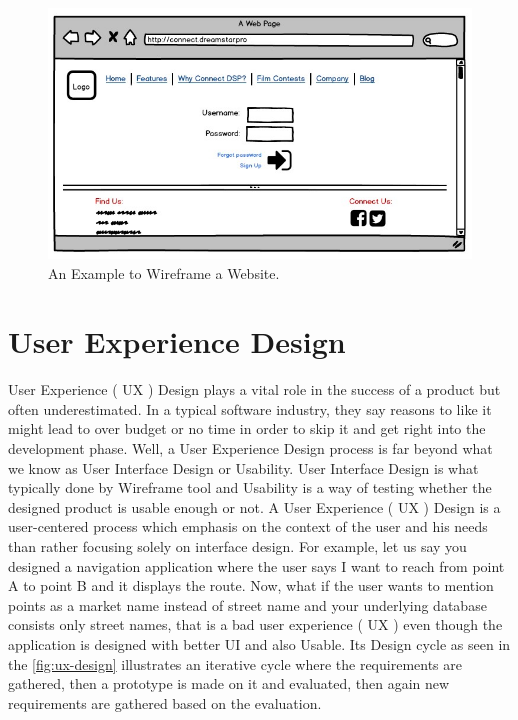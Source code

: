 \begin{figure}[hbt!]
	\centering
	\includegraphics[width=\linewidth]{figures/Connect_DSP}
	\caption{An Example to Wireframe a Website.\cite{B}}
	\label{fig:wireframe_website}
\end{figure}

\section{User Experience Design} 
\label{sec:uxd}

User Experience ( UX ) Design plays a vital role in the success of a product but often underestimated. In a typical software industry, they say reasons to like it might lead to over budget or no time in order to skip it and get right into the development phase. Well, a User Experience Design process is far beyond what we know as User Interface Design or Usability.  User Interface Design is what typically done by Wireframe tool and Usability is a way of testing whether the designed product is usable enough or not. A User Experience ( UX ) Design is a user-centered process which emphasis on the context of the user and his needs than rather focusing solely on interface design. \cite{UX} For example, let us say you designed a navigation application where the user says I want to reach from point A to point B and it displays the route. Now, what if the user wants to mention points as a market name instead of street name and your underlying database consists only street names, that is a bad user experience ( UX ) even though the application is designed with better UI and also Usable. Its Design \cite{UXD} cycle as seen in the \autoref{fig:ux-design} illustrates an iterative cycle where the requirements are gathered, then a prototype is made on it and evaluated, then again new requirements are gathered based on the evaluation. \\ \\


